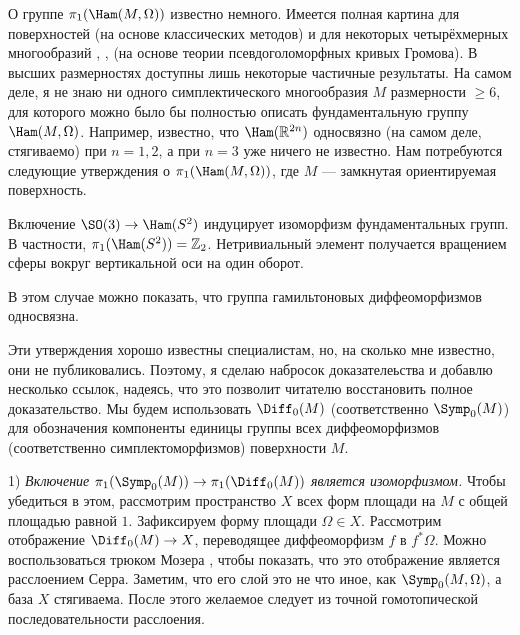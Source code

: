 О группе $\pi_1 (\Ham (M, \Omega))$ известно немного.
Имеется полная картина для поверхностей (на основе классических
методов) и для некоторых четырёхмерных многообразий \cite{G1},
\cite{A}, \cite{AM} (на основе теории псевдоголоморфных кривых
Громова). 
В высших размерностях доступны лишь некоторые частичные результаты.
На самом деле, я не знаю ни одного симплектического многообразия $M$
размерности $\ge 6$, для которого можно было бы полностью описать
фундаментальную группу $\Ham (M, \Omega)$. 
Например, известно, что $\Ham (\RR^{2n})$ односвязно (на самом деле,
стягиваемо) при $n = 1, 2$, а при $n = 3$ уже ничего не известно. 
Нам потребуются следующие утверждения о $\pi_1 (\Ham (M, \Omega))$,
где $M$ — замкнутая ориентируемая поверхность. 

\begin{ex}{}\label{7.2.A}
Включение $\SO(3) \z\to \Ham(S^2)$ индуцирует изоморфизм фундаментальных групп.
В частности, $\pi_1 (\Ham (S^2))\z=\ZZ_2$.
Нетривиальный элемент получается вращением сферы вокруг вертикальной
оси на один оборот. 
\end{ex}

\begin{ex}{}
\label{7.2.B}
В этом случае можно показать, что группа гамильтоновых диффеоморфизмов
односвязна. 
\end{ex}


Эти утверждения хорошо известны специалистам, но, на сколько мне известно,
они не публиковались.
Поэтому, я сделаю набросок доказателеьства и добавлю несколько ссылок,
надеясь, что это позволит читателю восстановить полное доказательство.
Мы будем использовать $\Diff_0 (M)$ (соответственно $\Symp_0 (M)$) для
обозначения компоненты единицы группы всех диффеоморфизмов
(соответственно симплектоморфизмов) поверхности $M$. 


1) \textit{Включение $\pi_1 (\Symp_0 (M)) \to \pi_1 (\Diff_0 (M))$ является
изоморфизмом.}
Чтобы убедиться в этом, рассмотрим пространство $X$ всех форм площади
на $M$ с общей площадью равной $1$. 
Зафиксируем форму площади $\Omega \in X$.
Рассмотрим отображение $\Diff_0 (M) \to X$, переводящее диффеоморфизм
$f$ в $f^\ast \Omega$. 
Можно воспользоваться трюком Мозера \cite[p. 94--95]{MS}, чтобы
показать, что это отображение является расслоением Серра. 
Заметим, что его слой это не что иное, как $\Symp_0 (M, \Omega)$, а
база $X$ стягиваема. 
После этого желаемое следует из точной гомотопической
последовательности расслоения. 

